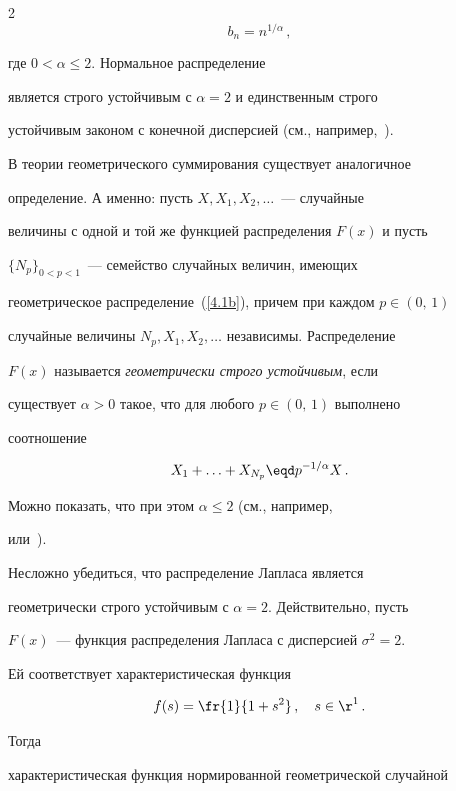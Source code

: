 \begin{multicols}{2}
$$


b_n=n^{1/\alpha}\,,


$$


где $0<\alpha\le 2$. Нормальное распределение


является строго устойчивым с $\alpha=2$ и единственным строго


устойчивым законом с конечной дисперсией (см., например,~\cite{18be}).





В теории геометрического суммирования существует аналогичное


определение. А именно: пусть $X,X_1,X_2,\ldots$~--- случайные


величины с одной и той же функцией распределения $F(x)$ и пусть


$\{N_p\}_{0<p<1}$~--- семейство случайных величин, имеющих


геометрическое распределение~(\ref{4.1b}), причем при каждом $p\in(0,\,1)$


случайные величины $N_p,X_1,X_2,\ldots$ независимы. Распределение


$F(x)$ называется {\it геометрически строго устойчивым}, если


существует $\alpha>0$ такое, что для любого $p\in(0,\,1)$ выполнено


соотношение


$$


X_1+\ldots+X_{N_p}\eqd p^{-1/\alpha}X\,.


$$


Можно показать, что при этом $\alpha\le2$ (см., например,~\cite{8be}


или~\cite{34be}).





Несложно убедиться, что распределение Лапласа является


геометрически строго устойчивым с $\alpha=2$. Действительно, пусть


$F(x)$~--- функция распределения Лапласа с дисперсией $\sigma^2=2$.


Ей соответствует характеристическая функция


$$


f(s)=\fr{1}{1+s^2}\,,\quad s\in {\r}^1\,.


$$


Тогда


характеристическая функция нормированной геометрической случайной



\end{multicols}
